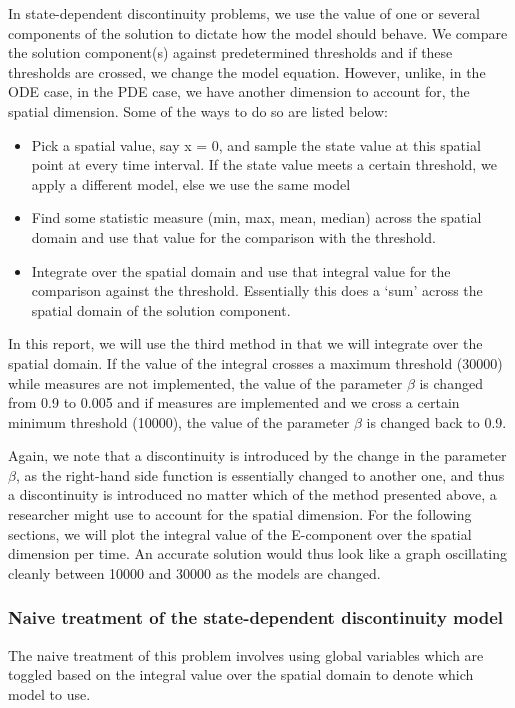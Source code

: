 \documentclass{article}
\begin{document}
In state-dependent discontinuity problems, we use the value of one or several components of the solution to dictate how the model should behave. We compare the solution component(s) against predetermined thresholds and if these thresholds are crossed, we change the model equation. However, unlike, in the ODE case, in the PDE case, we have another dimension to account for, the spatial dimension. Some of the ways to do so are listed below:
\begin{itemize}
\item Pick a spatial value, say x = 0, and sample the state value at this spatial point at every time interval. If the state value meets a certain threshold, we apply a different model, else we use the same model

\item Find some statistic measure (min, max, mean, median) across the spatial domain and use that value for the comparison with the threshold.

\item Integrate over the spatial domain and use that integral value for the comparison against the threshold. Essentially this does a `sum' across the spatial domain of the solution component.
\end{itemize}

In this report, we will use the third method in that we will integrate over the spatial domain. If the value of the integral crosses a maximum threshold (30000) while measures are not implemented, the value of the parameter $\beta$ is changed from 0.9 to 0.005 and if measures are implemented and we cross a certain minimum threshold (10000), the value of the parameter $\beta$ is changed back to 0.9. 

Again, we note that a discontinuity is introduced by the change in the parameter $\beta$, as the right-hand side function is essentially changed to another one, and thus a discontinuity is introduced no matter which of the method presented above, a researcher might use to account for the spatial dimension.
For the following sections, we will plot the integral value of the E-component over the spatial dimension per time. An accurate solution would thus look like a graph oscillating cleanly between 10000 and 30000 as the models are changed.
\subsubsection{Naive treatment of the state-dependent discontinuity model}
\label{subsubsection:pde_state_naive}
The naive treatment of this problem involves using global variables which are toggled based on the integral value over the spatial domain to denote which model to use. 
\end{document}
